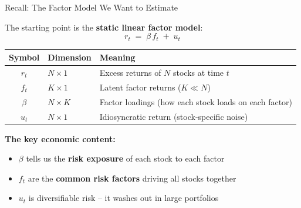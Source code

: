 \documentclass[aspectratio=169]{beamer}
\begin{document}
\begin{frame}{Recall: The Factor Model We Want to Estimate}

The starting point is the \textbf{static linear factor model}:
\[
\boxed{r_t \;=\; \beta\, f_t \;+\; u_t}
\]

\vspace{0.3em}

\begin{center}
\renewcommand{\arraystretch}{1.4}
\begin{tabular}{c l l}
\hline
\textbf{Symbol} & \textbf{Dimension} & \textbf{Meaning} \\
\hline
$r_t$ & $N \times 1$ & Excess returns of $N$ stocks at time $t$ \\
$f_t$ & $K \times 1$ & Latent factor returns ($K \ll N$) \\
$\beta$ & $N \times K$ & Factor loadings (how each stock loads on each factor) \\
$u_t$ & $N \times 1$ & Idiosyncratic return (stock-specific noise) \\
\hline
\end{tabular}
\end{center}

\vspace{0.5em}

\textbf{The key economic content:}
\begin{itemize}
    \item $\beta$ tells us the \textbf{risk exposure} of each stock to each factor
    \item $f_t$ are the \textbf{common risk factors} driving all stocks together
    \item $u_t$ is diversifiable risk -- it washes out in large portfolios
\end{itemize}

\end{frame}
%
%
\end{document}
